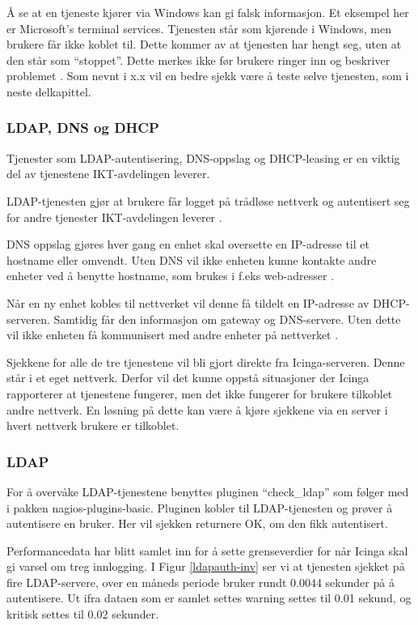 Å se at en tjeneste kjører via Windows kan gi falsk informasjon. Et eksempel her er Microsoft's terminal services. Tjenesten står som kjørende i Windows, men brukere får ikke koblet til. Dette kommer av at tjenesten har hengt seg, uten at den står som “stoppet”. Dette merkes ikke før brukere ringer inn og beskriver problemet \cite{serviceproblem}. Som nevnt i x.x vil en bedre sjekk være å teste selve tjenesten, som i neste delkapittel.

\subsubsection{LDAP, DNS og DHCP}

Tjenester som LDAP-autentisering, DNS-oppslag og DHCP-leasing er en viktig del av tjenestene IKT-avdelingen leverer.

LDAP-tjenesten gjør at brukere får logget på trådløse nettverk og autentisert seg for andre tjenester IKT-avdelingen leverer \cite{ldap}.

DNS oppslag gjøres hver gang en enhet skal oversette en IP-adresse til et hostname eller omvendt. Uten DNS vil ikke enheten kunne kontakte andre enheter ved å benytte hostname, som brukes i f.eks web-adresser \cite{dns}. 

Når en ny enhet kobles til nettverket vil denne få tildelt en IP-adresse av DHCP-serveren. Samtidig får den informasjon om gateway og DNS-servere. Uten dette vil ikke enheten få kommunisert med andre enheter på nettverket \cite{dhcp}.

Sjekkene for alle de tre tjenestene vil bli gjort direkte fra Icinga-serveren. Denne står i et eget nettverk. Derfor vil det kunne oppstå situasjoner der Icinga rapporterer at tjenestene fungerer, men det ikke fungerer for brukere tilkoblet andre nettverk. En løsning på dette kan være å kjøre sjekkene via en server i hvert nettverk brukere er tilkoblet.


\subsubsection{LDAP}

For å overvåke LDAP-tjenestene benyttes pluginen “check\_ldap” som følger med i pakken nagios-plugins-basic. Pluginen kobler til LDAP-tjenesten og prøver å autentisere en bruker. Her vil sjekken returnere OK, om den fikk autentisert. 

Performancedata har blitt samlet inn for å sette grenseverdier for når Icinga skal gi varsel om treg innlogging. I Figur \ref{ldapauth-inv} ser vi at tjenesten sjekket på fire LDAP-servere, over en måneds periode bruker rundt 0.0044 sekunder på å autentisere. Ut ifra dataen som er samlet settes warning settes til 0.01 sekund, og kritisk settes til 0.02 sekunder.

